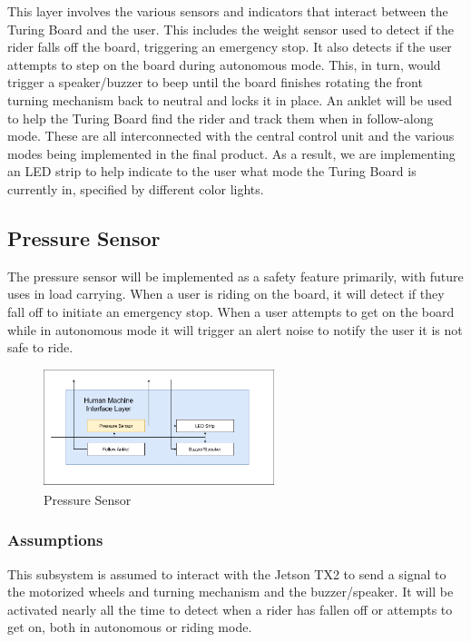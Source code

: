 This layer involves the various sensors and indicators that interact between the Turing Board and the user. This includes the weight sensor used to detect if the rider falls off the board, triggering an emergency stop. It also detects if the user attempts to step on the board during autonomous mode. This, in turn, would trigger a speaker/buzzer to beep until the board finishes rotating the front turning mechanism back to neutral and locks it in place. An anklet will be used to help the Turing Board find the rider and track them when in follow-along mode. These are all interconnected with the central control unit and the various modes being implemented in the final product. As a result, we are implementing an LED strip to help indicate to the user what mode the Turing Board is currently in, specified by different color lights.

\subsection{Pressure Sensor}
The pressure sensor will be implemented as a safety feature primarily, with future uses in load carrying. When a user is riding on the board, it will detect if they fall off to initiate an emergency stop. When a user attempts to get on the board while in autonomous mode it will trigger an alert noise to notify the user it is not safe to ride.

\begin{figure}[h!]
	\centering
 	\includegraphics[width=0.60\textwidth]{ADS Latex/images/Kendall/Pressure Sensor.png}
 \caption{Pressure Sensor}
\end{figure}

\subsubsection{Assumptions}
This subsystem is assumed to interact with the Jetson TX2 to send a signal to the motorized wheels and turning mechanism and the buzzer/speaker. It will be activated nearly all the time to detect when a rider has fallen off or attempts to get on, both in autonomous or riding mode.

